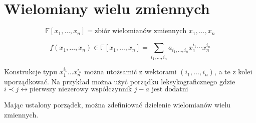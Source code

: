 \documentclass{../notatki}
\begin{document}
\section{Wielomiany wielu zmiennych}

$$
\mathbb{F}[x_1, \dots, x_n] = \text{zbiór wielomianów zmiennych }
x_1, \dots, x_n
$$

$$
f(x_1, \dots, x_n) \in \mathbb{F}[x_1, \dots, x_n] = \sum_{i_1, \dots,
i_n} a_{i_1, \dots, i_n} x_1^{i_1} \cdots x_n^{i_n}
$$

Konstrukcje typu $x_1^{i_1} \dots x_n^{i_n}$ można utożsamić z
wektorami $(i_1, \dots, i_n)$, a te z kolei uporządkować. Na przykład można użyć
porządku leksykograficznego gdzie $i \prec j \leftrightarrow
\text{pierwszy niezerowy współczynnik } j - a \text{ jest dodatni}$

Mając ustalony porządek, można zdefiniować dzielenie wielomianów
wielu zmiennych.
\end{document}
